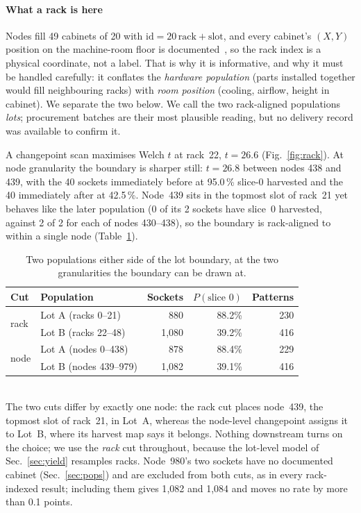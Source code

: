 \documentclass[10pt,conference]{IEEEtran}
\begin{document}
\paragraph*{What a rack is here} Nodes fill 49 cabinets of 20 with
$\mathrm{id}=20\,\mathrm{rack}+\mathrm{slot}$, and every cabinet's $(X,Y)$ position on the
machine-room floor is documented~\cite{exadata_repo}, so the rack index is a physical coordinate,
not a label. That is why it is informative, and why it must be handled carefully: it conflates the
\emph{hardware population} (parts installed together would fill neighbouring racks) with
\emph{room position} (cooling, airflow, height in cabinet). We separate the two below. We call the
two rack-aligned populations \emph{lots}; procurement batches are their most plausible reading, but
no delivery record was available to confirm it.

A changepoint scan maximises Welch $t$ at rack~22, $t=26.6$ (Fig.~\ref{fig:rack}). At node
granularity the boundary is sharper still: $t=26.8$ between nodes 438 and 439, with the 40 sockets
immediately before at 95.0\,\% slice-0 harvested and the 40 immediately after at 42.5\,\%.
Node~439 sits in the topmost slot of rack~21 yet behaves like the later population (0 of its 2
sockets have slice~0 harvested, against 2 of 2 for each of nodes 430--438), so the
boundary is rack-aligned to within a single node (Table~\ref{tab:lots}).

\begin{table}[h]\centering\caption{Two populations either side of the lot boundary, at the two
granularities the boundary can be drawn at.}\label{tab:lots}
\begin{tabular}{llrrr}\toprule
Cut & Population & Sockets & $P(\text{slice 0})$ & Patterns\\\midrule
\multirow{2}{*}{rack} & Lot A (racks 0--21)  &   880 & 88.2\% & 230\\
                      & Lot B (racks 22--48) & 1{,}080 & 39.2\% & 416\\\midrule
\multirow{2}{*}{node} & Lot A (nodes 0--438) &   878 & 88.4\% & 229\\
                      & Lot B (nodes 439--979) & 1{,}082 & 39.1\% & 416\\
\bottomrule\end{tabular}
\\[2pt]\footnotesize The two cuts differ by exactly one node: the rack cut places node~439, the
topmost slot of rack~21, in Lot~A, whereas the node-level changepoint assigns it to Lot~B, where its
harvest map says it belongs. Nothing downstream turns on the choice; we use the \emph{rack} cut
throughout, because the lot-level model of Sec.~\ref{sec:yield} resamples racks. Node~980's two
sockets have no documented cabinet (Sec.~\ref{sec:pops}) and are excluded from both cuts, as in
every rack-indexed result; including them gives 1{,}082 and 1{,}084 and moves no rate by more than
0.1 points.
\end{table}
\end{document}
